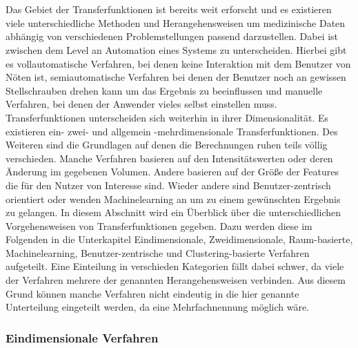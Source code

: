 \chapter{}
\label{sec:state_of_the_art}






Das Gebiet der Transferfunktionen ist bereits weit erforscht und es existieren viele unterschiedliche Methoden und Herangehensweisen um medizinische Daten abhängig von verschiedenen Problemstellungen passend darzustellen.
\newline
Dabei ist zwischen dem Level an Automation eines Systems zu unterscheiden. Hierbei gibt es vollautomatische Verfahren, bei denen keine Interaktion mit dem Benutzer von Nöten ist, semiautomatische Verfahren bei denen der Benutzer noch an gewissen Stellschrauben drehen kann um das Ergebnis zu beeinflussen und manuelle Verfahren, bei denen der Anwender vieles selbst einstellen muss. Transferfunktionen unterscheiden sich weiterhin in ihrer Dimensionalität. Es existieren ein- zwei- und allgemein -mehrdimensionale Transferfunktionen.
\newline
Des Weiteren sind die Grundlagen auf denen die Berechnungen ruhen teils völlig verschieden. Manche Verfahren basieren auf den Intensitätswerten oder deren Änderung im gegebenen Volumen. Andere basieren auf der Größe der Features die für den Nutzer von Interesse sind. Wieder andere sind Benutzer-zentrisch orientiert oder wenden Machinelearning an um zu einem gewünschten Ergebnis zu gelangen.
\newline
In diesem Abschnitt wird ein Überblick über die unterschiedlichen Vorgehensweisen von Transferfunktionen gegeben. Dazu werden diese im Folgenden in die Unterkapitel Eindimensionale, Zweidimensionale, Raum-basierte, Machinelearning, Benutzer-zentrische und Clustering-basierte Verfahren aufgeteilt.
\newline
Eine Einteilung in verschieden Kategorien fällt dabei schwer, da viele der Verfahren mehrere der genannten Herangehensweisen verbinden. Aus diesem Grund können manche Verfahren nicht eindeutig in die hier genannte Unterteilung eingeteilt werden, da eine Mehrfachnennung möglich wäre.


\subsection{Eindimensionale Verfahren}

